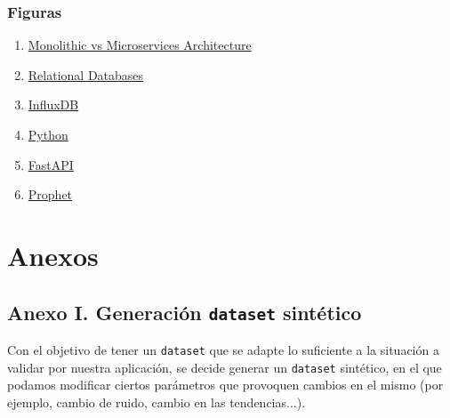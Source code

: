 \documentclass[a4paper, oneside, 12pt]{book}
\begin{document}
	\vspace{20px}
	
	\subsection*{Figuras}

	\begin{enumerate}
		
		\item
		\label{bib_img: microservice architecture}
		\href{https://xbsoftware.com/blog/microservices-vs-monolithic-architecture/}{Monolithic vs Microservices Architecture}
		
		\item
		\label{bib_img: example sql}
		\href{https://xbsoftware.com/blog/main-types-of-database-management-systems/}{Relational Databases}
		
		\item
		\label{bib_img: influxdb logo}
		\href{https://www.influxdata.com/}{InfluxDB}
		
		\item
		\label{bib_img: python logo}
		\href{https://www.python.org/}{Python}
		
		\item
		\label{bib_img: fastapi logo}
		\href{https://fastapi.tiangolo.com/}{FastAPI}
		
		\item
		\label{bib_img: prophet logo}
		\href{https://facebook.github.io/prophet/}{Prophet}
		
		
	\end{enumerate}
	
	\pagebreak
	
	\chapter*{Anexos}
	
	\section*{Anexo I. Generación \texttt{dataset} sintético}
	\label{sec: anexo 1 dataset}
	
	\noindent Con el objetivo de tener un \texttt{dataset} que se adapte lo suficiente a la situación a validar por nuestra aplicación, se decide generar un \texttt{dataset} sintético, en el que podamos modificar ciertos parámetros que provoquen cambios en el mismo (por ejemplo, cambio de ruido, cambio en las tendencias...). \\
	
\end{document}
